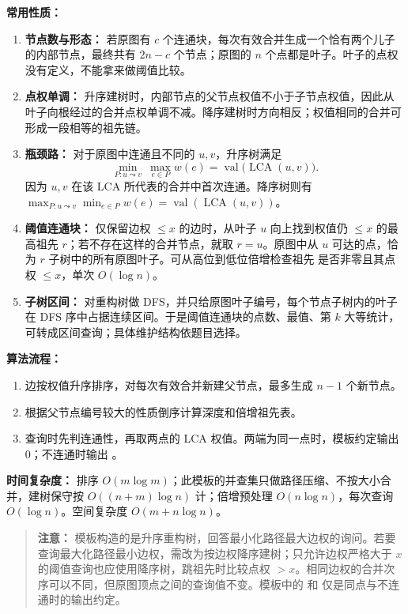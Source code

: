 \textbf{常用性质：}
\begin{enumerate}
  \item \textbf{节点数与形态：} 若原图有 $c$ 个连通块，每次有效合并生成一个恰有两个儿子的内部节点，最终共有 $2n-c$ 个节点；原图的 $n$ 个点都是叶子。叶子的点权没有定义，不能拿来做阈值比较。
  \item \textbf{点权单调：} 升序建树时，内部节点的父节点权值不小于子节点权值，因此从叶子向根经过的合并点权单调不减。降序建树时方向相反；权值相同的合并可形成一段相等的祖先链。
  \item \textbf{瓶颈路：} 对于原图中连通且不同的 $u,v$，升序树满足
  \[
    \min_{P:u\leadsto v}\ \max_{e\in P} w(e)
    = \operatorname{val}\bigl(\operatorname{LCA}(u,v)\bigr).
  \]
  因为 $u,v$ 在该 LCA 所代表的合并中首次连通。降序树则有 $\max_{P:u\leadsto v}\min_{e\in P}w(e)=\operatorname{val}(\operatorname{LCA}(u,v))$。
  \item \textbf{阈值连通块：} 仅保留边权 $\le x$ 的边时，从叶子 $u$ 向上找到权值仍 $\le x$ 的最高祖先 $r$；若不存在这样的合并节点，就取 $r=u$。原图中从 $u$ 可达的点，恰为 $r$ 子树中的所有原图叶子。可从高位到低位倍增检查祖先  是否非零且其点权 $\le x$，单次 $O(\log n)$。
  \item \textbf{子树区间：} 对重构树做 DFS，并只给原图叶子编号，每个节点子树内的叶子在 DFS 序中占据连续区间。于是阈值连通块的点数、最值、第 $k$ 大等统计，可转成区间查询；具体维护结构依题目选择。
\end{enumerate}

\textbf{算法流程：}
\begin{enumerate}
  \item 边按权值升序排序，对每次有效合并新建父节点，最多生成 $n-1$ 个新节点。
  \item 根据父节点编号较大的性质倒序计算深度和倍增祖先表。
  \item 查询时先判连通性，再取两点的 LCA 权值。两端为同一点时，模板约定输出 $0$；不连通时输出 。
\end{enumerate}

\textbf{时间复杂度：} 排序 $O(m\log m)$；此模板的并查集只做路径压缩、不按大小合并，建树保守按 $O((n+m)\log n)$ 计；倍增预处理 $O(n\log n)$，每次查询 $O(\log n)$。空间复杂度 $O(m+n\log n)$。

\begin{quote}
\textbf{注意：} 模板构造的是升序重构树，回答最小化路径最大边权的询问。若要查询最大化路径最小边权，需改为按边权降序建树；只允许边权严格大于 $x$ 的阈值查询也应使用降序树，跳祖先时比较点权 $>x$。相同边权的合并次序可以不同，但原图顶点之间的查询值不变。模板中的  和  仅是同点与不连通时的输出约定。
\end{quote}

